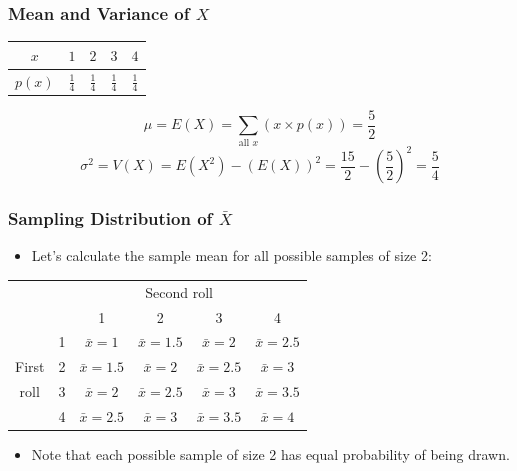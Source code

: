 \documentclass[12pt]{beamer}
\begin{document}
\begin{frame}
	\frametitle{Mean and Variance of $X$}
	\begin{center}
		\begin{tabular}{ccccc}
			\toprule
			$x$&$1$&$2$&$3$&$4$\\
			\midrule
			$p(x)$&$\frac{1}{4}$&$\frac{1}{4}$&$\frac{1}{4}$&$\frac{1}{4}$\\
			\bottomrule
		\end{tabular}
	\end{center}
	$$\mu=E(X)=\sum_{\text{all }x}(x\times p(x))=\frac{5}{2}$$
	$$\sigma^2=V(X)=E(X^2)-(E(X))^2=\frac{15}{2}-(\frac{5}{2})^2=\frac{5}{4}$$
\end{frame}

\begin{frame}
	\frametitle{Sampling Distribution of $\bar{X}$}
	
	\begin{itemize}[label={\color{blue}$\blacktriangleright$}]
		\item Let's calculate the sample mean for all possible samples of size 2:
	\end{itemize}
	
	\vspace{0.5cm}
	
	\begin{table}
		\centering
		\begin{tabular}{cccccc}
			\toprule
			& \multicolumn{5}{c}{Second roll} \\
			& &1 & 2 & 3 & 4 \\
			\midrule
			&1 & $\bar{x} = 1$ & $\bar{x} = 1.5$ & $\bar{x} = 2$ & $\bar{x} = 2.5$ \\
			First &2 & $\bar{x} = 1.5$ & $\bar{x} = 2$ & $\bar{x} = 2.5$ & $\bar{x} = 3$ \\
			roll &3 & $\bar{x} = 2$ & $\bar{x} = 2.5$ & $\bar{x} = 3$ & $\bar{x} = 3.5$ \\
			&4 & $\bar{x} = 2.5$ & $\bar{x} = 3$ & $\bar{x} = 3.5$ & $\bar{x} = 4$ \\
			\bottomrule
		\end{tabular}
	\end{table}
	
	\vspace{0.5cm}
	
	\begin{itemize}[label={\color{blue}$\blacktriangleright$}]
		\item Note that each possible sample of size 2 has equal probability of being drawn.
	\end{itemize}
	
\end{frame}
\end{document}
